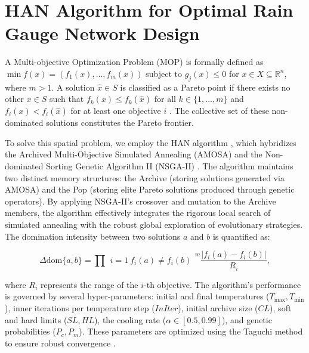 \documentclass[10pt,twoside]{article}
\numberwithin{equation}{section}
\begin{document}
 

\section{HAN Algorithm for Optimal Rain Gauge Network Design}



A Multi-objective Optimization Problem (MOP) is formally defined as $\min f(x) = (f_1(x), \ldots, f_m(x))$ subject to $g_j(x) \leq 0$ for $x \in X \subseteq \mathbb{R}^n$, where $m > 1$. A solution $\hat{x} \in S$ is classified as a Pareto point if there exists no other $x \in S$ such that $f_k(x) \leq f_k(\hat{x})$ for all $k \in \{1, \ldots, m\}$ and $f_i(x) < f_i(\hat{x})$ for at least one objective $i$ \citep{Ehrgott:2005}. The collective set of these non-dominated solutions constitutes the Pareto frontier.




To solve this spatial problem, we employ the HAN algorithm \citep{Lotfian:2023}, which hybridizes the Archived Multi-Objective Simulated Annealing (AMOSA) \citep{Bandyopadhyay:2008} and the Non-dominated Sorting Genetic Algorithm II (NSGA-II) \citep{Deb:2002}. The algorithm maintains two distinct memory structures: the Archive (storing solutions generated via AMOSA) and the Pop (storing elite Pareto solutions produced through genetic operators). By applying NSGA-II’s crossover and mutation to the Archive members, the algorithm effectively integrates the rigorous local search of simulated annealing with the robust global exploration of evolutionary strategies. The domination intensity between two solutions $a$ and $b$ is quantified as:

\begin{equation*}

	\Delta\text{dom}\{a,b\} = \prod{\substack{i=1 \ f_i(a) \neq f_i(b)}}^{m} \frac{|f_i(a) - f_i(b)|}{R_i},

\end{equation*}

where $R_i$ represents the range of the $i$-th objective. The algorithm's performance is governed by several hyper-parameters: initial and final temperatures ($T_{\max}, T_{\min}$), inner iterations per temperature step ($InIter$), initial archive size ($CL$), soft and hard limits ($SL, HL$), the cooling rate ($\alpha \in [0.5, 0.99]$), and genetic probabilities ($P_c, P_m$). These parameters are optimized using the Taguchi method to ensure robust convergence \citep{Taguchi:1986}.
\end{document}
